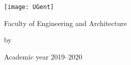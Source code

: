 

\begin{titlepage}

\fontsize{12pt}{14pt}
\selectfont

\begin{center}

\texttt{[image: UGent]}

\vspace{0.5cm}

Faculty of Engineering and Architecture

\vspace{4.0cm}

\fontsize{17.28pt}{21pt}
\selectfont

\thetitle

\fontsize{12pt}{14pt}
\selectfont

\vspace{.3cm}

by

\vspace{.6cm}

\theauthor

\vspace{4.5cm}

Academic year 2019--2020

\end{center}
\end{titlepage}

\newpage\thispagestyle{empty}\mbox{}
